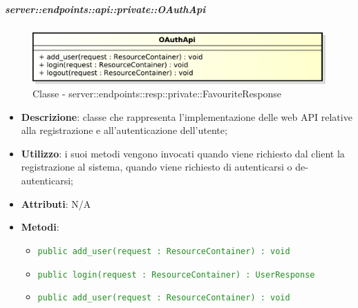 
	\subparagraph{server::endpoints::api::private::OAuthApi} %
    \label{subp:bdsm_app_server_endpoints_api_private_oauthapi}
  \begin{figure}[!htbp]
    \centering
    \centerline{\includegraphics[scale=0.6]{./images/server/classes/endpoints/o_auth_api.pdf}}
    \caption{Classe - server::endpoints::resp::private::FavouriteResponse}
  \end{figure}
    \begin{itemize}
      	\item \textbf{Descrizione}: classe che rappresenta l'implementazione delle web API relative alla registrazione e all'autenticazione dell'utente;
      	\item \textbf{Utilizzo}: i suoi metodi vengono invocati quando viene richiesto dal client la registrazione al sistema, quando viene richiesto di autenticarsi o de-autenticarsi;
		\item \textbf{Attributi}: N/A
		\item \textbf{Metodi}:
    \begin{itemize}
        \item \textcolor{forestgreen}{\texttt{public add\_user(request : ResourceContainer) : void}}
        \item \textcolor{forestgreen}{\texttt{public login(request : ResourceContainer) : UserResponse}}
         \item \textcolor{forestgreen}{\texttt{public add\_user(request : ResourceContainer) : void}}
       \end{itemize}
    \end{itemize}

